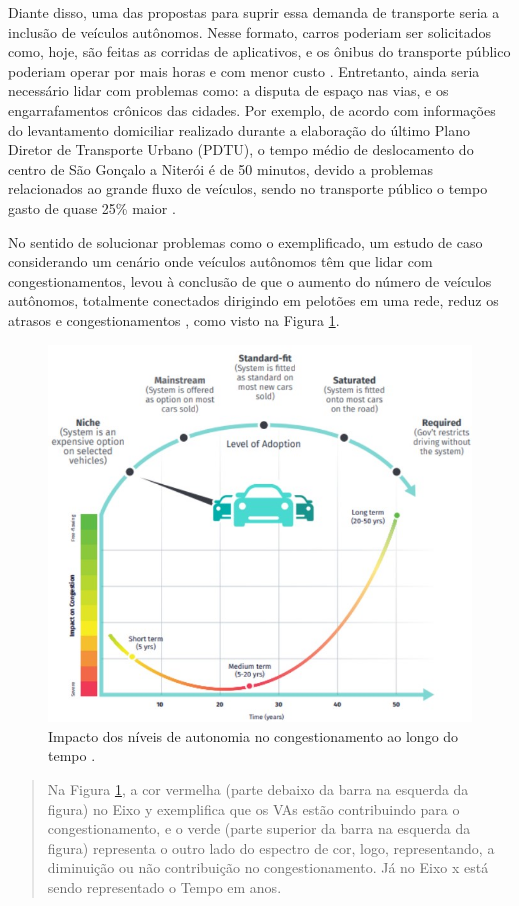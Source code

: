 Diante disso, uma das propostas para suprir essa demanda de transporte seria a inclusão de veículos autônomos. Nesse formato, carros poderiam ser solicitados como, hoje, são feitas as corridas de aplicativos, e os ônibus do transporte público poderiam operar por mais horas e com menor custo \cite{4cenarios_ocidental}. 
Entretanto, ainda seria necessário lidar com problemas como: a disputa de espaço nas vias, e os engarrafamentos crônicos das cidades. Por exemplo, de acordo com informações do levantamento domiciliar realizado durante a elaboração do último Plano Diretor de Transporte Urbano (PDTU), o tempo médio de deslocamento do centro de São Gonçalo a Niterói é de 50 minutos, devido a problemas relacionados ao grande fluxo de veículos, sendo no transporte público o tempo gasto de quase 25\% maior \cite{rj_transito}.

No sentido de solucionar problemas como o exemplificado, um estudo de caso considerando um cenário onde veículos autônomos têm que lidar com congestionamentos, levou à conclusão de que o aumento do número de veículos autônomos, totalmente conectados dirigindo em pelotões em uma rede, reduz os atrasos e congestionamentos \cite{conge}, como visto na Figura \ref{congestionamento}.

\begin{figure}[H]
\centering
\includegraphics[width=15cm]{Figures/conge.jpg}
\caption{Impacto dos níveis de autonomia no congestionamento ao longo do tempo \cite{4cenarios_ocidental}.}
\label{congestionamento}
\end{figure}
\begin{quote}
Na Figura \ref{congestionamento}, a cor vermelha (parte debaixo da barra na esquerda da figura) no Eixo y  exemplifica que os VAs estão contribuindo para o congestionamento, e o verde (parte superior da barra na esquerda da figura) representa o outro lado do espectro de cor, logo, representando, a diminuição ou não contribuição no congestionamento. Já no Eixo x está sendo representado o Tempo em anos.
\end{quote}

